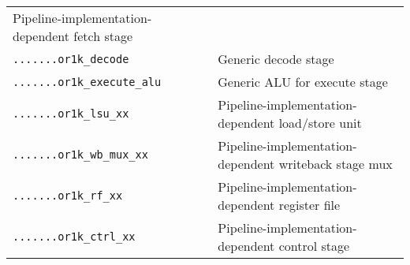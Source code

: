 \documentclass[]{article}
\begin{document}
\begin{longtable}[]{@{}ll@{}}
\begin{minipage}[t]{0.65\columnwidth}
Pipeline-implementation-dependent fetch stage\strut
\end{minipage}\tabularnewline
\begin{minipage}[t]{0.29\columnwidth}\raggedright\strut
\texttt{.......or1k\_decode}\strut
\end{minipage} & \begin{minipage}[t]{0.65\columnwidth}\raggedright\strut
Generic decode stage\strut
\end{minipage}\tabularnewline
\begin{minipage}[t]{0.29\columnwidth}\raggedright\strut
\texttt{.......or1k\_execute\_alu}\strut
\end{minipage} & \begin{minipage}[t]{0.65\columnwidth}\raggedright\strut
Generic ALU for execute stage\strut
\end{minipage}\tabularnewline
\begin{minipage}[t]{0.29\columnwidth}\raggedright\strut
\texttt{.......or1k\_lsu\_xx}\strut
\end{minipage} & \begin{minipage}[t]{0.65\columnwidth}\raggedright\strut
Pipeline-implementation-dependent load/store unit\strut
\end{minipage}\tabularnewline
\begin{minipage}[t]{0.29\columnwidth}\raggedright\strut
\texttt{.......or1k\_wb\_mux\_xx}\strut
\end{minipage} & \begin{minipage}[t]{0.65\columnwidth}\raggedright\strut
Pipeline-implementation-dependent writeback stage mux\strut
\end{minipage}\tabularnewline
\begin{minipage}[t]{0.29\columnwidth}\raggedright\strut
\texttt{.......or1k\_rf\_xx}\strut
\end{minipage} & \begin{minipage}[t]{0.65\columnwidth}\raggedright\strut
Pipeline-implementation-dependent register file\strut
\end{minipage}\tabularnewline
\begin{minipage}[t]{0.29\columnwidth}\raggedright\strut
\texttt{.......or1k\_ctrl\_xx}\strut
\end{minipage} & \begin{minipage}[t]{0.65\columnwidth}\raggedright\strut
Pipeline-implementation-dependent control stage\strut
\end{minipage}\tabularnewline
\bottomrule
\end{longtable}
\end{document}
